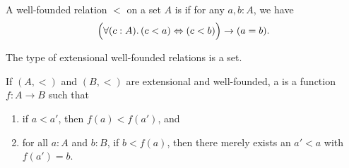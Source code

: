 \documentclass[hott-all.tex]{subfiles}
\begin{document}
% 
% 
\begin{defn}
  A well-founded relation $<$ on a set $A$ is 
  if for any $a,b:A$, we have
  \[ \Parens{\fall{c:A} (c<a) \Leftrightarrow (c<b)} \to (a=b). \]
\end{defn}
% 
% 
\begin{thm}
  The type of extensional well-founded relations is a set.
\end{thm}
% 
% 
\begin{defn}
  If $(A,<)$ and $(B,<)$ are extensional and well-founded, a 
  is a function $f:A\to B$ such that
  \begin{enumerate}
  \item if $a<a'$, then $f(a)<f(a')$, and
  \item for all $a:A$ and $b:B$, if $b<f(a)$, then there merely exists an $a'<a$ with $f(a')=b$.
  \end{enumerate}
\end{defn}
\end{document}
